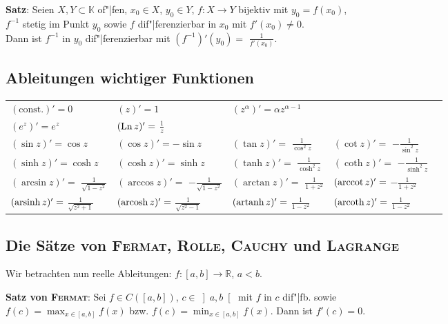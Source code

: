 \textbf{Satz}:
Seien $X, Y \subset \mathbb{K}$ of"|fen, $x_0 \in X$, $y_0 \in Y$,
$f: X \rightarrow Y$ bijektiv mit $y_0 = f(x_0)$, \\
$f^{-1}$ stetig im Punkt $y_0$ sowie $f$ dif"|ferenzierbar in $x_0$ mit
$f'(x_0) \not= 0$. \\
Dann ist $f^{-1}$ in $y_0$ dif"|ferenzierbar mit
$(f^{-1})'(y_0) =$ {\large $\frac{1}{f'(x_0)}$}.

\subsection{%
    Ableitungen wichtiger Funktionen%
}

\begin{tabular}{lllll}
    $(\text{const.})' = 0$ &
    $(z)' = 1$ &
    $(z^\alpha)' = \alpha z^{\alpha - 1}$ \\
    $(e^z)' = e^z$ &
    $(\operatorname{Ln} z)' =$ {\large $\frac{1}{z}$}  \\ \hline
    $(\sin z)' = \cos z$ &
    $(\cos z)' = -\sin z$ &
    $(\tan z)' =$ {\large $\frac{1}{\cos^2 z}$} &
    $(\cot z)' =$ {\large $-\frac{1}{\sin^2 z}$} \\
    $(\sinh z)' = \cosh z$ &
    $(\cosh z)' = \sinh z$ &
    $(\tanh z)' =$ {\large $\frac{1}{\cosh^2 z}$} &
    $(\coth z)' =$ {\large $-\frac{1}{\sinh^2 z}$} \\ \hline
    $(\arcsin z)' =$ {\large $\frac{1}{\sqrt{1 - z^2}}$} &
    $(\arccos z)' =$ {\large $-\frac{1}{\sqrt{1 - z^2}}$} &
    $(\arctan z)' =$ {\large $\frac{1}{1 + z^2}$} &
    $(\operatorname{arccot} z)' =$ {\large $-\frac{1}{1 + z^2}$} \\
    $(\operatorname{arsinh} z)' =$ {\large $\frac{1}{\sqrt{z^2 + 1}}$} &
    $(\operatorname{arcosh} z)' =$ {\large $\frac{1}{\sqrt{z^2 - 1}}$} &
    $(\operatorname{artanh} z)' =$ {\large $\frac{1}{1 - z^2}$} &
    $(\operatorname{arcoth} z)' =$ {\large $\frac{1}{1 - z^2}$}
\end{tabular}

\subsection{%
    Die Sätze von \textsc{Fermat}, \textsc{Rolle}, \textsc{Cauchy} und
    \textsc{Lagrange}%
}

Wir betrachten nun reelle Ableitungen: $f: [a,b] \rightarrow \mathbb{R}$,
$a < b$.

\textbf{Satz von \textsc{Fermat}}:
Sei $f \in C([a,b])$,
$c \in \left]a,b\right[$ mit $f$ in $c$ dif"|fb. sowie \\
$f(c) = \max_{x \in [a,b]} f(x)$ bzw. $f(c) = \min_{x \in [a,b]} f(x)$. \qquad
Dann ist $f'(c) = 0$.

